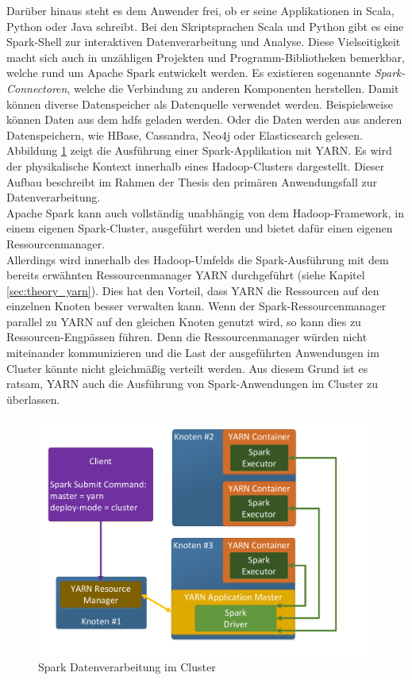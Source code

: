 \noindent
Darüber hinaus steht es dem Anwender frei, ob er seine Applikationen in Scala, Python oder Java schreibt. Bei den Skriptsprachen Scala und Python gibt es eine Spark-Shell zur interaktiven Datenverarbeitung und Analyse. Diese Vielseitigkeit macht sich auch in unzähligen Projekten und Programm-Bibliotheken bemerkbar, welche rund um Apache Spark entwickelt werden.
Es existieren sogenannte \textit{Spark-Connectoren}, welche die Verbindung zu anderen Komponenten herstellen. Damit können diverse Datenspeicher als Datenquelle verwendet werden. Beispielsweise können Daten aus dem \gls{hdfs} geladen werden. Oder die Daten werden aus anderen Datenspeichern, wie HBase, Cassandra, Neo4j oder Elasticsearch gelesen.\\

\noindent
Abbildung \ref{fig:spark_cluster_architecture} zeigt die Ausführung einer Spark-Applikation mit YARN. Es wird der physikalische Kontext innerhalb eines Hadoop-Clusters dargestellt. Dieser Aufbau beschreibt im Rahmen der Thesis den primären Anwendungsfall zur Datenverarbeitung.\\ 
Apache Spark kann auch vollständig unabhängig von dem Hadoop-Framework, in einem eigenen Spark-Cluster, ausgeführt werden und bietet dafür einen eigenen Ressourcenmanager.\\
Allerdings wird innerhalb des Hadoop-Umfelds die Spark-Ausführung mit dem bereits erwähnten Ressourcenmanager YARN durchgeführt (siehe Kapitel \ref{sec:theory_yarn}). 
Dies hat den Vorteil, dass YARN die Ressourcen auf den einzelnen Knoten besser verwalten kann. Wenn der Spark-Ressourcenmanager parallel zu YARN auf den gleichen Knoten genutzt wird, so kann dies zu Ressourcen-Engpässen führen. 
Denn die Ressourcenmanager würden nicht miteinander kommunizieren und die Last der ausgeführten Anwendungen im Cluster könnte nicht gleichmäßig verteilt werden. Aus diesem Grund ist es ratsam, YARN auch die Ausführung von Spark-Anwendungen im Cluster zu überlassen.\\

\begin{figure}[ht]
  \centering
  \includegraphics[width=\textwidth]{./resource/spark_cluster_architecture.pdf}
  \caption{Spark Datenverarbeitung im Cluster}
  \label{fig:spark_cluster_architecture}
\end{figure}

